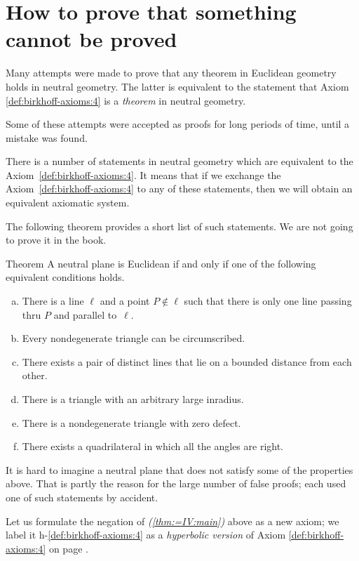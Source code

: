 \section*{How to prove that something\\ 
cannot be proved}

Many attempts were made to prove that any theorem in Euclidean geometry holds in neutral geometry.
The latter is equivalent to the statement that Axiom \ref{def:birkhoff-axioms:4} is a {}\emph{theorem} in neutral geometry.

Some of these attempts were accepted as proofs for long periods of time, until a mistake was found.

There is a number of statements in neutral geometry which are equivalent to the Axiom~\ref{def:birkhoff-axioms:4}.
It means that if we exchange the Axiom~\ref{def:birkhoff-axioms:4}  to any of these statements, then we will obtain an equivalent axiomatic system.

The following theorem provides a short list of such statements.
We are not going to prove it in the book.

\begin{thm}{Theorem}\label{thm:=IV}
A neutral plane is Euclidean if and only if one of the following equivalent conditions holds.
\begin{enumerate}[(a)]
\item\label{thm:=IV:main} 
There is a line $\ell$ 
and a point $P\notin\ell$ 
such that there is only one line passing thru $P$ 
and parallel to~$\ell$.
\item 
Every nondegenerate triangle can be circumscribed.
\item
There exists a pair of distinct lines that lie on a bounded distance from each other.
\item
There is a triangle with an arbitrary large inradius.
\item
There is a nondegenerate triangle with zero defect.
\item
There exists a quadrilateral in which all the angles are right.
\end{enumerate}
\end{thm}

It is hard to imagine a neutral plane that does not satisfy some of the properties above.
That is partly the reason for the large number of false proofs;
each used one of such statements by accident.

Let us formulate the negation of \textit{(\ref{thm:=IV:main})} above as a new axiom;
we label it h-$\!$\ref{def:birkhoff-axioms:4} as a {}\emph{hyperbolic version} of Axiom \ref{def:birkhoff-axioms:4} on page \pageref{def:birkhoff-axioms:4}.


